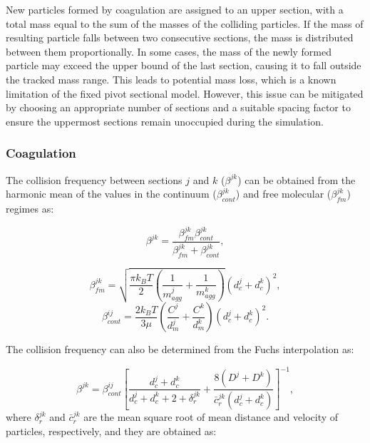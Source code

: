 New particles formed by coagulation are assigned to an upper section, with a total mass equal to the sum of the masses of the colliding particles. If the mass of resulting particle falls between two consecutive sections, the mass is distributed between them proportionally. In some cases, the mass of the newly formed particle may exceed the upper bound of the last section, causing it to fall outside the tracked mass range. This leads to potential mass loss, which is a known limitation of the fixed pivot sectional model. However, this issue can be mitigated by choosing an appropriate number of sections and a suitable spacing factor to ensure the uppermost sections remain unoccupied during the simulation.
 
\subsubsection{Coagulation}
\label{sec:seccoag}
 
The collision frequency between sections $j$ and $k$ ($\beta^{jk}$) can be obtained from the harmonic mean of the values in the continuum ($\beta_{cont}^{jk}$) and free molecular ($\beta_{fm}^{jk}$) regimes as:

\begin{equation}
	\beta^{jk} = 				       \frac{\beta^{jk}_{fm}\beta^{jk}_{cont}}{\beta^{jk}_{fm}
		+\beta^{jk}_{cont}}
	\label{eqn:betahmsect},
\end{equation}

\begin{equation}
	\beta^{jk}_{fm} =
	\sqrt{
		\frac{\pi k_B T}{2}
		\left(
		\frac{1}{m^j_{agg}}+
		\frac{1}{m^k_{agg}}
		\right)
	} 
	\left(
	d^j_c+d^k_c
	\right)^2
	\label{eqn:betafmsect},
\end{equation}
\begin{equation}
	\beta^{ij}_{cont} = \frac{2k_BT}{3\mu}
	\left(
	\frac{C^j}{d^j_m}+
	\frac{C^k}{d^k_m}
	\right)
	\left(
	d^j_c+d^k_c
	\right)^2
	\label{eqn:betacontsect}.
\end{equation}

The collision frequency can also be determined from the Fuchs interpolation as:

\begin{equation}
	\beta^{jk}=
	\beta^{ij}_{cont}
	\left[
	\frac{d^j_c+d^k_c}{d^j_c+d^k_c+2+\delta^{jk}_r}+
	\frac{8\left(D^j+D^k\right)}
	{\bar{c}^{jk}_r\left(d^j_c+d^k_c\right)}
	\right]^{-1},
	\label{eqn:betafuchssect}
\end{equation}
\noindent where ${\delta^{jk}_r}$ and ${\bar{c}^{jk}_r}$ are the mean square root of mean distance and velocity of particles, respectively, and they are obtained as:

